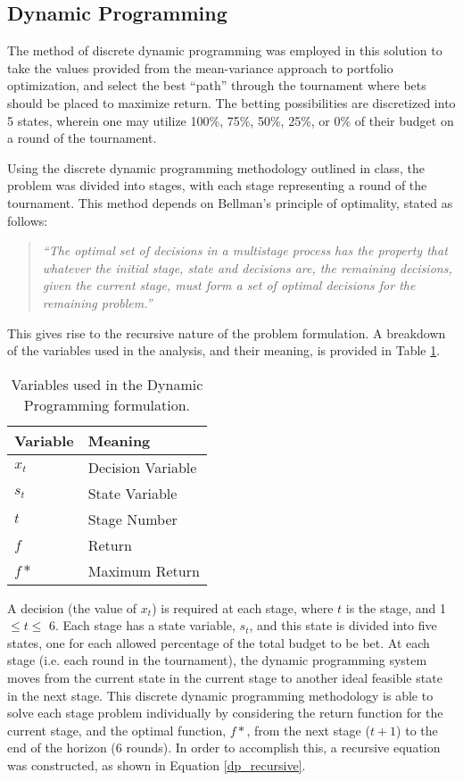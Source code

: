 \documentclass[12pt]{article}
\begin{document}
\subsection{Dynamic Programming}
The method of discrete dynamic programming was employed in this solution to take the values provided from the mean-variance approach to portfolio optimization, and select the best ``path'' through the tournament where bets should be placed to maximize return.
The betting possibilities are discretized into 5 states, wherein one may utilize 100\%, 75\%, 50\%, 25\%, or 0\% of their budget on a round of the tournament.

Using the discrete dynamic programming methodology outlined in class, the problem was divided into stages, with each stage representing a round of the tournament.
This method depends on Bellman's principle of optimality, stated as follows:
\begin{quote}
\emph{``The optimal set of decisions in a multistage process has the property that whatever the initial stage, state and decisions are, the remaining decisions, given the current stage, must form a set of optimal decisions for the remaining problem.''}
\end{quote}
This gives rise to the recursive nature of the problem formulation.
A breakdown of the variables used in the analysis, and their meaning, is provided in Table \ref{dp_vars}. \\

\begin{table}[htbp!]
\begin{centering}
    \begin{tabular}{|l|l|}
    \hline
    Variable & Meaning           \\ \hline
    $x_{t}$        & Decision Variable \\ \hline
    $s_{t}$        & State Variable    \\ \hline
    $t$        & Stage Number             \\ \hline
    $f$        & Return            \\ \hline
    $f*$       & Maximum Return    \\ \hline
    \end{tabular}
    \label{dp_vars}
    \caption{Variables used in the Dynamic Programming formulation.}
\end{centering}
\end{table}

A decision (the value of $x_{t}$) is required at each stage, where $t$ is the stage, and 1 $\le t \le$ 6.
Each stage has a state variable, $s_{t}$, and this state is divided into five states, one for each allowed percentage of the total budget to be bet.
At each stage (i.e. each round in the tournament), the dynamic programming system moves from the current state in the current stage to another ideal feasible state in the next stage.
This discrete dynamic programming methodology is able to solve each stage problem individually by considering the return function for the current stage, and the optimal function, $f*$, from the next stage ($t + 1$) to the end of the horizon (6 rounds).
In order to accomplish this, a recursive equation was constructed, as shown in Equation \ref{dp_recursive}.
\end{document}
